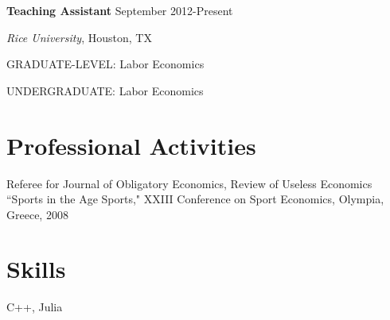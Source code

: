 \documentclass[11pt]{res} %
\newcommand{\forceindent}{\leavevmode{\parindent=24pt\indent}}
\begin{document}
\begin{resume}
\textbf{Teaching Assistant} \hfill     September 2012-Present \par
\forceindent \emph{Rice University}, Houston, TX \par
\forceindent GRADUATE-LEVEL: Labor Economics\par
\forceindent UNDERGRADUATE: Labor Economics\par

\section{Professional Activities}
\vspace{6pt}%

Referee for Journal of Obligatory Economics, Review of Useless Economics \\
``Sports in the Age Sports," XXIII Conference on Sport Economics, Olympia, Greece, 2008

\section{Skills}
\vspace{6pt}%

C++, Julia

\end{resume}
\end{document}
